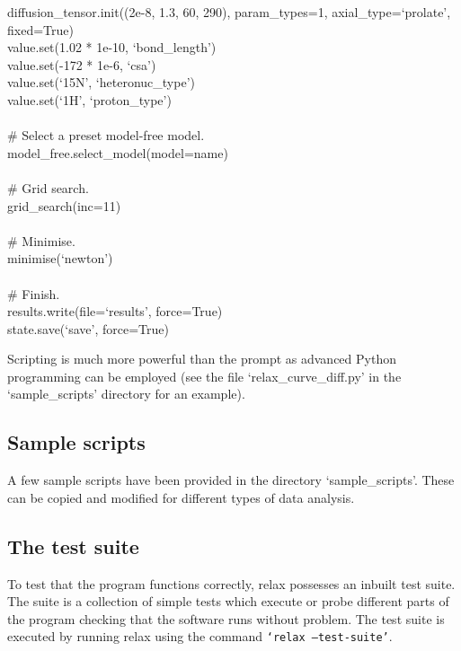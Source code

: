 \begin{exampleenv}
diffusion\_tensor.init((2e-8, 1.3, 60, 290), param\_types=1, axial\_type=`prolate', fixed=True) \\
value.set(1.02 * 1e-10, `bond\_length') \\
value.set(-172 * 1e-6, `csa') \\
value.set(`15N', `heteronuc\_type') \\
value.set(`1H', `proton\_type') \\
 \\
\# Select a preset model-free model. \\
model\_free.select\_model(model=name) \\
 \\
\# Grid search. \\
grid\_search(inc=11) \\
 \\
\# Minimise. \\
minimise(`newton') \\
 \\
\# Finish. \\
results.write(file=`results', force=True) \\
state.save(`save', force=True)
\end{exampleenv}

Scripting is much more powerful than the prompt as advanced Python programming can be employed (see the file `relax\_curve\_diff.py' in the `sample\_scripts' directory for an example).




\subsection{Sample scripts}

A few sample scripts have been provided in the directory `sample\_scripts'.  These can be copied and modified for different types of data analysis.




\subsection{The test suite}

To test that the program functions correctly, relax possesses an inbuilt test suite.  The suite is a collection of simple tests which execute or probe different parts of the program checking that the software runs without problem.  The test suite is executed by running relax using the command \texttt{`relax --test-suite'}.



